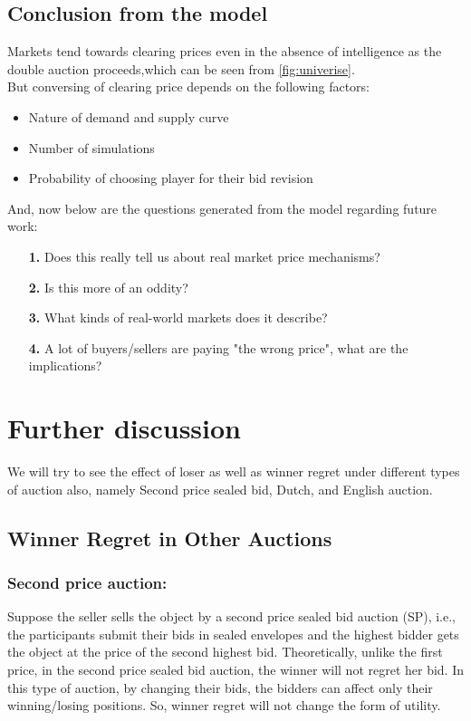 \documentclass[10pt,a4paper,oneside]{report}
\begin{document}
\section{Conclusion from the model}
Markets tend towards clearing prices even in the absence of intelligence as the double auction proceeds,which can be seen from \ref{fig:univerise}.\\
\noindent But conversing of clearing price depends on the following factors:
\begin{itemize}
\item Nature of demand and supply curve
\item Number of simulations
\item Probability of choosing player for their bid revision
\end{itemize}
 And, now below are the questions generated from the model regarding future work:
 \begin{enumerate}
 \item[\textbf{1.}] Does this really tell us about real market price mechanisms?
\item[\textbf{2.}] Is this more of an oddity?
\item[\textbf{3.}] What kinds of real-world markets does it describe?
\item[\textbf{4.}] A lot of buyers/sellers are paying "the wrong price", what are the implications? 
 
\end{enumerate}

\chapter{Further discussion}
We will try to see the effect of loser as well as winner regret under different types of auction also, namely Second price sealed bid, Dutch, and English auction.\citep{filizy2005auctions}
\section{Winner Regret in Other Auctions}
\subsection{Second price auction:}
Suppose the seller sells the object by a second price sealed bid auction (SP), i.e., the participants submit their bids in sealed envelopes and the highest bidder gets the object at the price of the second highest bid. Theoretically, unlike the first price, in the second price sealed bid auction, the winner will not regret her bid. In this type of auction, by changing their bids, the bidders can affect only their winning/losing positions. So, winner regret will not change the form of utility.
\end{document}
